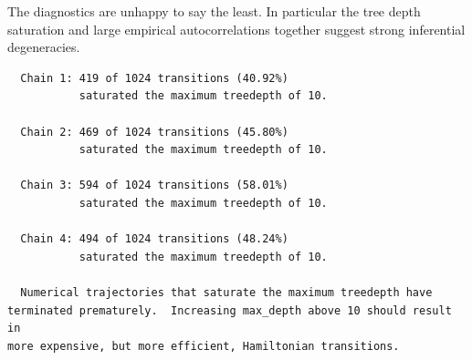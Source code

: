\documentclass[
  letterpaper,
  DIV=11,
  numbers=noendperiod]{scrartcl}
\newenvironment{Shaded}{\begin{snugshade}}{\end{snugshade}}
\newcommand{\AttributeTok}[1]{\textcolor[rgb]{0.40,0.45,0.13}{#1}}
\newcommand{\ConstantTok}[1]{\textcolor[rgb]{0.56,0.35,0.01}{#1}}
\newcommand{\FunctionTok}[1]{\textcolor[rgb]{0.28,0.35,0.67}{#1}}
\newcommand{\NormalTok}[1]{\textcolor[rgb]{0.00,0.23,0.31}{#1}}
\newcommand{\OtherTok}[1]{\textcolor[rgb]{0.00,0.23,0.31}{#1}}
\newcommand{\SpecialCharTok}[1]{\textcolor[rgb]{0.37,0.37,0.37}{#1}}
\newcommand{\StringTok}[1]{\textcolor[rgb]{0.13,0.47,0.30}{#1}}
\begin{document}
The diagnostics are unhappy to say the least. In particular the tree
depth saturation and large empirical autocorrelations together suggest
strong inferential degeneracies.

\begin{Shaded}
\end{Shaded}

\begin{verbatim}
  Chain 1: 419 of 1024 transitions (40.92%)
           saturated the maximum treedepth of 10.

  Chain 2: 469 of 1024 transitions (45.80%)
           saturated the maximum treedepth of 10.

  Chain 3: 594 of 1024 transitions (58.01%)
           saturated the maximum treedepth of 10.

  Chain 4: 494 of 1024 transitions (48.24%)
           saturated the maximum treedepth of 10.

  Numerical trajectories that saturate the maximum treedepth have
terminated prematurely.  Increasing max_depth above 10 should result in
more expensive, but more efficient, Hamiltonian transitions.
\end{verbatim}

\begin{Shaded}
\end{Shaded}
\end{document}
